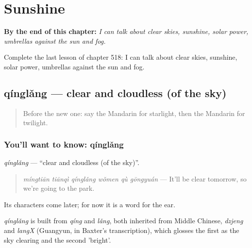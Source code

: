 
\chapter{Sunshine}
\label{ch:zh-sunshine}

\begin{chapteropening}
\textbf{By the end of this chapter:} \emph{I can talk about clear skies, sunshine, solar power, umbrellas against the sun and fog.}

Complete the last lesson of chapter 518: I can talk about clear skies, sunshine, solar power, umbrellas against the sun and fog.
\end{chapteropening}

\section[qínglǎng]{qínglǎng — clear and cloudless (of the sky)}

\label{lesson:ZH-C518-qinglang}



\begin{quote}
Before the new one: say the Mandarin for starlight, then the Mandarin for twilight.
\end{quote}

\subsection*{You'll want to know: qínglǎng}
\emph{qínglǎng} — \textquotedblleft{}clear and cloudless (of the sky)\textquotedblright{}.

\begin{quote}
\emph{míngtiān tiānqì qínglǎng wǒmen qù gōngyuán} — It'll be clear tomorrow, so we're going to the park.
\end{quote}

Its characters come later; for now it is a word for the ear.

\begin{cousinweb}
\emph{qínglǎng} is built from \emph{qíng} and \emph{lǎng}, both inherited from Middle Chinese, \emph{dzjeng} and \emph{langX} (Guangyun, in Baxter's transcription), which glosses the first as the sky clearing and the second 'bright'.
\end{cousinweb}

